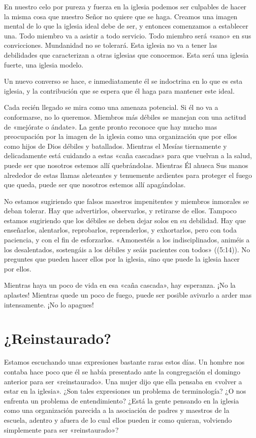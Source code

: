 \documentclass[12pt, twoside, openright]{book}
\begin{document}
En nuestro celo por pureza y fuerza en la iglesia podemos ser culpables de hacer la misma cosa que nuestro Señor no quiere que se haga. Creamos una imagen mental de lo que la iglesia ideal debe de ser, y entonces comenzamos a establecer una. Todo miembro va a asistir a todo servicio. Todo miembro será «sano» en sus convicciones. Mundanidad no se tolerará. Esta iglesia no va a tener las debilidades que caracterizan a otras iglesias que conocemos. Esta será una iglesia fuerte, una iglesia modelo.

Un nuevo converso se hace, e inmediatamente él se indoctrina en lo que es esta iglesia, y la contribución que se espera que él haga para mantener este ideal. 

Cada recién llegado se mira como una amenaza potencial. Si él no va a conformarse, no lo queremos. Miembros más débiles se manejan con una actitud de «mejórate o ándate». La gente pronto reconoce que hay mucho mas preocupación por la imagen de la iglesia como una organización que por ellos como hijos de Dios débiles y batallados. Mientras el Mesías tiernamente y delicadamente está cuidando a estas «caña cascadas» para que vuelvan a la salud, puede ser que nosotros estemos allí quebrándolas. Mientras Él ahueca Sus manos alrededor de estas llamas aleteantes y tenuemente ardientes para proteger el fuego que queda, puede ser que nosotros estemos allí apagándolas.

No estamos sugiriendo que falsos maestros impenitentes y miembros inmorales se deban tolerar. Hay que advertirlos, observarlos, y retirarse de ellos. Tampoco estamos sugiriendo que los débiles se deben dejar solos en su debilidad. Hay que enseñarlos, alentarlos, reprobarlos, reprenderlos, y exhortarlos, pero con toda paciencia, y con el fin de esforzarlos. «Amonestéis a los indisciplinados, animéis a los desalentados, sostengáis a los débiles y seáis pacientes con todos» ((5:14)). No preguntes que pueden hacer ellos por la iglesia, sino que puede la iglesia hacer por ellos. 

Mientras haya un poco de vida en esa «caña cascada», hay esperanza. ¡No la aplastes! Mientras quede un poco de fuego, puede ser posible avivarlo a arder mas intensamente. ¡No lo apagues!

\section{¿Reinstaurado?}
Estamos escuchando unas expresiones bastante raras estos días. Un hombre nos contaba hace poco que él se había presentado ante la congregación el domingo anterior para ser «reinstaurado». Una mujer dijo que ella pensaba en «volver a estar en la iglesia». ¿Son tales expresiones un problema de terminología? ¿O nos enfrenta un problema de entendimiento? ¿Está la gente pensando en la iglesia como una organización parecida a la asociación de padres y maestros de la escuela, adentro y afuera de lo cual ellos pueden ir como quieran, volviendo simplemente para ser «reinstaurado»? 
\end{document}
